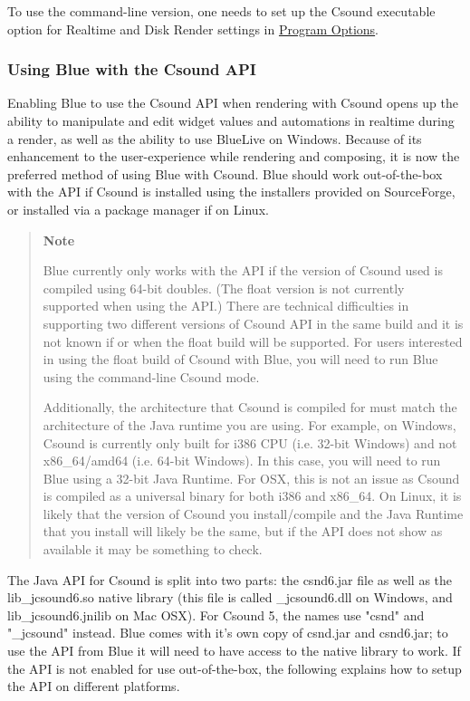 To use the command-line version, one needs to set up the Csound
executable option for Realtime and Disk Render settings in
\protect\hyperlink{programOptions}{Program Options}.

\subsubsection{Using Blue with the Csound API}\label{csoundAPI}

Enabling Blue to use the Csound API when rendering with Csound opens up
the ability to manipulate and edit widget values and automations in
realtime during a render, as well as the ability to use BlueLive on
Windows. Because of its enhancement to the user-experience while
rendering and composing, it is now the preferred method of using Blue
with Csound. Blue should work out-of-the-box with the API if Csound is
installed using the installers provided on SourceForge, or installed via
a package manager if on Linux.

\begin{quote}
\textbf{Note}

Blue currently only works with the API if the version of Csound used is
compiled using 64-bit doubles. (The float version is not currently
supported when using the API.) There are technical difficulties in
supporting two different versions of Csound API in the same build and it
is not known if or when the float build will be supported. For users
interested in using the float build of Csound with Blue, you will need
to run Blue using the command-line Csound mode.

Additionally, the architecture that Csound is compiled for must match
the architecture of the Java runtime you are using. For example, on
Windows, Csound is currently only built for i386 CPU (i.e. 32-bit
Windows) and not x86\_64/amd64 (i.e. 64-bit Windows). In this case, you
will need to run Blue using a 32-bit Java Runtime. For OSX, this is not
an issue as Csound is compiled as a universal binary for both i386 and
x86\_64. On Linux, it is likely that the version of Csound you
install/compile and the Java Runtime that you install will likely be the
same, but if the API does not show as available it may be something to
check.
\end{quote}

The Java API for Csound is split into two parts: the csnd6.jar file as
well as the lib\_jcsound6.so native library (this file is called
\_jcsound6.dll on Windows, and lib\_jcsound6.jnilib on Mac OSX). For
Csound 5, the names use "csnd" and "\_jcsound" instead. Blue comes with
it's own copy of csnd.jar and csnd6.jar; to use the API from Blue it
will need to have access to the native library to work. If the API is
not enabled for use out-of-the-box, the following explains how to setup
the API on different platforms.

